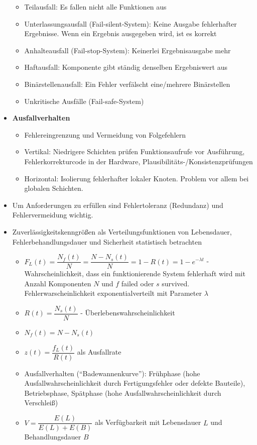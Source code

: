 \begin{itemize}
\begin{itemize}
		\item Teilausfall: Es fallen nicht alle Funktionen aus
		\item Unterlassungsausfall (Fail-silent-System): Keine Ausgabe fehlerhafter Ergebnisse. Wenn ein Ergebnis ausgegeben wird, ist es korrekt
		\item Anhalteausfall (Fail-stop-System): Keinerlei Ergebnisausgabe mehr
		\item Haftausfall: Komponente gibt ständig denselben Ergebniswert aus
		\item Binärstellenausfall: Ein Fehler verfälscht eine/mehrere Binärstellen
		\item Unkritische Ausfälle (Fail-safe-System)
	\end{itemize}
	\item \textbf{Ausfallverhalten}
	\begin{itemize}
		\item Fehlereingrenzung und Vermeidung von Folgefehlern
			\item Vertikal: Niedrigere Schichten prüfen Funktionsaufrufe vor Ausführung, Fehlerkorrekturcode in der Hardware, Plausibilitäts-/Konsistenzprüfungen
			\item Horizontal: Isolierung fehlerhafter lokaler Knoten. Problem vor allem bei globalen Schichten.		 
	\end{itemize}
	\item Um Anforderungen zu erfüllen sind Fehlertoleranz (Redundanz) und Fehlervermeidung wichtig.
	\item Zuverlässigkeitskenngrößen als Verteilungsfunktionen von Lebensdauer, Fehlerbehandlungsdauer und Sicherheit statistisch betrachten
	\begin{itemize}
		\item $F_L(t)=\dfrac{N_f(t)}{N}=\dfrac{N-N_s(t)}{N}=1-R(t)=1-e^{-\lambda t}$ - Wahrscheinlichkeit, dass ein funktionierende System fehlerhaft wird mit Anzahl Komponenten $N$ und $f$ failed oder $s$ survived. Fehlerwarscheinlichkeit exponentialverteilt mit Parameter $\lambda$
		\item $R(t)=\dfrac{N_s(t)}{N}$ - Überlebenswahrscheinlichkeit
		\item $N_f(t)=N-N_s(t)$
		\item $z(t)=\dfrac{f_L(t)}{R(t)}$ als Ausfallrate
		\item Ausfallverhalten ("`Badewannenkurve"'): Frühphase (hohe Ausfallwahrscheinlichkeit durch Fertigungsfehler oder defekte Bauteile), Betriebsphase, Spätphase (hohe Ausfallwahrscheinlichkeit durch Verschleiß)
		\item $V=\dfrac{E(L)}{E(L)+E(B)}$ als Verfügbarkeit mit Lebensdauer $L$ und Behandlungsdauer $B$

\end{itemize}
\end{itemize}
